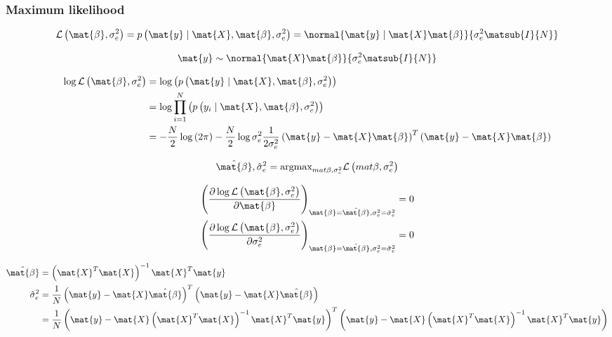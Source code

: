 \subsubsection{Maximum likelihood}
\begin{equation}
\mathcal{L} \left( \mat{\beta}, \sigma^2_e \right) = p \left(\mat{y} \mid \mat{X}, \mat{\beta}, \sigma^2_e \right) = \normal {\mat{y} \mid \mat{X}\mat{\beta}} {\sigma^2_e\matsub{I}{N}}
\end{equation}

\begin{equation}
\label{eq:normal-matrix}
\mat{y} \sim \normal {\mat{X}\mat{\beta}} {\sigma^2_e\matsub{I}{N}}
\end{equation}

\begin{align}
\log\mathcal{L} \left( \mat{\beta}, \sigma^2_e \right) & = \log \left(p \left(\mat{y} \mid \mat{X}, \mat{\beta}, \sigma^2_e \right)\right) \\
& = \log \prod^N_{i=1} \left(p \left(y_i \mid \mat{X}, \mat{\beta}, \sigma^2_e \right)\right) \\
& =  -\frac{N}{2}\log\left(2\pi\right) - \frac{N}{2}\log\sigma^2_e  \frac{1}{2\sigma^2_e } \left(\mat{y} - \mat{X}\mat{\beta}\right)^T  \left(\mat{y} - \mat{X}\mat{\beta}\right)
\end{align}


\begin{equation}
\hat{\mat{\beta}},\hat{\sigma}^2_e = \text{argmax}_{mat{\beta},\sigma^2_e} \mathcal{L}\left(mat{\beta},\sigma^2_e\right)
\end{equation}

\begin{align}
\left(\frac{\partial\log\mathcal{L}\left(\mat{\beta},\sigma^2_e\right)}{\partial \mat{\beta}}\right)_{\mat{\beta}=\hat{\mat{\beta}},\sigma^2_e=\hat{\sigma}^2_e} &= 0 \\
\left(\frac{\partial\log\mathcal{L}\left(\mat{\beta},\sigma^2_e\right)}{\partial \sigma^2_e}\right)_{\mat{\beta}=\hat{\mat{\beta}},\sigma^2_e=\hat{\sigma}^2_e} &= 0
\end{align}

\begin{align}
\hat{\mat{\beta}} &= \left(\mat{X}^T\mat{X}\right)^{-1}\mat{X}^T\mat{y} \\
\hat{\sigma}^2_e &= \frac{1}{N}\left(\mat{y} - \mat{X}\hat{\mat{\beta}}\right)^T\left(\mat{y} - \mat{X}\hat{\mat{\beta}}\right) \\
&= \frac{1}{N}\left(\mat{y} -\mat{X}\left(\mat{X}^T\mat{X}\right)^{-1}\mat{X}^T\mat{y}\right)^T\left(\mat{y} -\mat{X}\left(\mat{X}^T\mat{X}\right)^{-1}\mat{X}^T\mat{y}\right)
\end{align}

